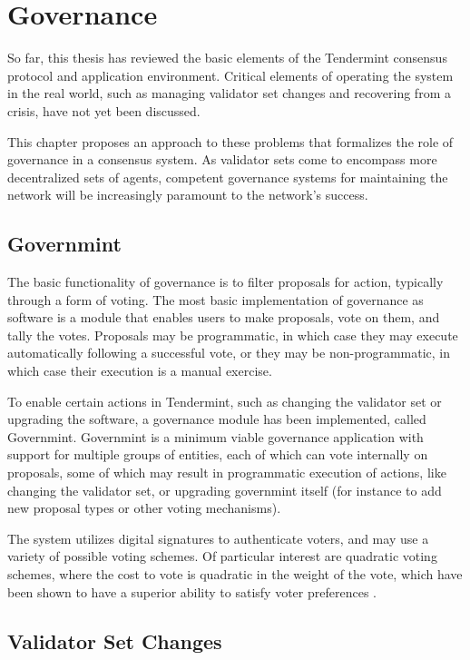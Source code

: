 \chapter{Governance}
\label{ch:governance}

So far, this thesis has reviewed the basic elements of the Tendermint consensus protocol and application environment.
Critical elements of operating the system in the real world, such as managing validator set changes
and recovering from a crisis, have not yet been discussed. 

This chapter proposes an approach to these problems that formalizes the role of governance in a consensus system.
As validator sets come to encompass more decentralized sets of agents, competent governance systems 
for maintaining the network will be increasingly paramount to the network's success.

\section{Governmint}

The basic functionality of governance is to filter proposals for action, typically through a form of voting.
The most basic implementation of governance as software is a module that enables users to make proposals,
vote on them, and tally the votes. 
Proposals may be programmatic, in which case they may execute automatically following a successful vote,
or they may be non-programmatic, in which case their execution is a manual exercise.

To enable certain actions in Tendermint, such as changing the validator set or upgrading the software,
a governance module has been implemented, called Governmint.
Governmint is a minimum viable governance application with support for multiple groups of entities,
each of which can vote internally on proposals, some of which may result in programmatic execution of actions,
like changing the validator set, or upgrading governmint itself (for instance to add new proposal types or other voting mechanisms).

The system utilizes digital signatures to authenticate voters, 
and may use a variety of possible voting schemes.
Of particular interest are quadratic voting schemes,
where the cost to vote is quadratic in the weight of the vote,
which have been shown to have a superior ability to satisfy voter preferences \cite{quadratic_voting}.

\section{Validator Set Changes}

